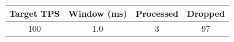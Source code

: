 \begin{tabular}{cccc}
\hline
Target TPS & Window (ms) & Processed & Dropped \\
\hline
100 & 1.0 & 3 & 97 \\
\hline
\end{tabular}

